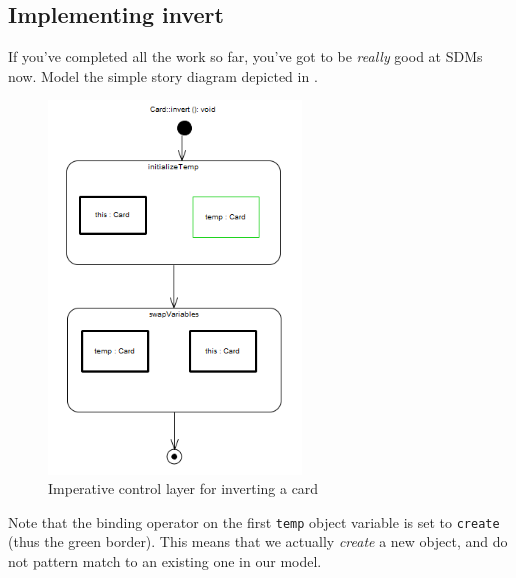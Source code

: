 \newpage
\hypertarget{invertCard vis}{}
\subsection{Implementing invert}
\genHeader

\begin{stepbystep}

\vspace{0.5cm}

\item If you've completed all the work so far, you've got to be \emph{really} good at SDMs now. Model the simple story diagram
depicted in .

\vspace{0.5cm}

\begin{figure}[htbp]
\begin{center}
  \includegraphics[width=0.6\textwidth]{../../org.moflon.doc.handbook.03_storyDiagrams/07_invertCard/visICImages/ea_invertEmpty}
  \caption{Imperative control layer for inverting a card}  
  \label{ea:sdm_invertEmpty}
\end{center}
\end{figure}

\item Note that the binding operator on the first \texttt{temp} object variable is set to \texttt{create} (thus the green
border). This means that we actually \emph{create} a new object, and do not pattern match to an existing one in our model.


\end{stepbystep}
